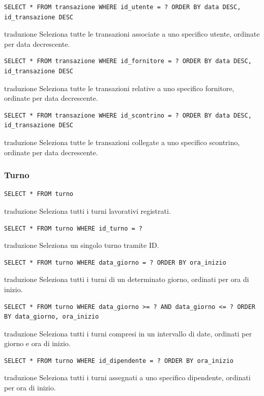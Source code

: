 \documentclass[12pt,a4paper]{report}
\begin{document}
\begin{lstlisting}[style=sqlstyle]
SELECT * FROM transazione WHERE id_utente = ? ORDER BY data DESC, id_transazione DESC
\end{lstlisting}
traduzione {Seleziona tutte le transazioni associate a uno specifico utente, ordinate per data decrescente.}

\begin{lstlisting}[style=sqlstyle]
SELECT * FROM transazione WHERE id_fornitore = ? ORDER BY data DESC, id_transazione DESC
\end{lstlisting}
traduzione {Seleziona tutte le transazioni relative a uno specifico fornitore, ordinate per data decrescente.}

\begin{lstlisting}[style=sqlstyle]
SELECT * FROM transazione WHERE id_scontrino = ? ORDER BY data DESC, id_transazione DESC
\end{lstlisting}
traduzione {Seleziona tutte le transazioni collegate a uno specifico scontrino, ordinate per data decrescente.}

\subsubsection*{Turno}
\begin{lstlisting}[style=sqlstyle]
SELECT * FROM turno
\end{lstlisting}
traduzione {Seleziona tutti i turni lavorativi registrati.}

\begin{lstlisting}[style=sqlstyle]
SELECT * FROM turno WHERE id_turno = ?
\end{lstlisting}
traduzione {Seleziona un singolo turno tramite ID.}

\begin{lstlisting}[style=sqlstyle]
SELECT * FROM turno WHERE data_giorno = ? ORDER BY ora_inizio
\end{lstlisting}
traduzione {Seleziona tutti i turni di un determinato giorno, ordinati per ora di inizio.}

\begin{lstlisting}[style=sqlstyle]
SELECT * FROM turno WHERE data_giorno >= ? AND data_giorno <= ? ORDER BY data_giorno, ora_inizio
\end{lstlisting}
traduzione {Seleziona tutti i turni compresi in un intervallo di date, ordinati per giorno e ora di inizio.}

\begin{lstlisting}[style=sqlstyle]
SELECT * FROM turno WHERE id_dipendente = ? ORDER BY ora_inizio
\end{lstlisting}
traduzione {Seleziona tutti i turni assegnati a uno specifico dipendente, ordinati per ora di inizio.}
\end{document}
